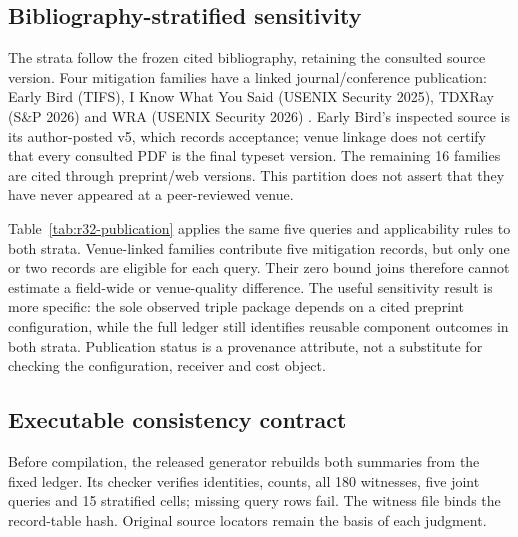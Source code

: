 \subsection{Bibliography-stratified sensitivity}
The strata follow the frozen cited bibliography, retaining the consulted source version. Four mitigation families have a linked journal/conference publication: Early Bird (TIFS), I Know What You Said (USENIX Security 2025), TDXRay (S\&P 2026) and WRA (USENIX Security 2026) \cite{earlybird2025,gao2025iknow,hornetz2026tdxray,jeong2026wra}. Early Bird's inspected source is its author-posted v5, which records acceptance; venue linkage does not certify that every consulted PDF is the final typeset version. The remaining 16 families are cited through preprint/web versions. This partition does not assert that they have never appeared at a peer-reviewed venue.

Table~\ref{tab:r32-publication} applies the same five queries and applicability rules to both strata. Venue-linked families contribute five mitigation records, but only one or two records are eligible for each query. Their zero bound joins therefore cannot estimate a field-wide or venue-quality difference. The useful sensitivity result is more specific: the sole observed triple package depends on a cited preprint configuration, while the full ledger still identifies reusable component outcomes in both strata. Publication status is a provenance attribute, not a substitute for checking the configuration, receiver and cost object.


\subsection{Executable consistency contract}
Before compilation, the released generator rebuilds both summaries from the fixed ledger. Its checker verifies identities, counts, all 180 witnesses, five joint queries and 15 stratified cells; missing query rows fail. The witness file binds the record-table hash. Original source locators remain the basis of each judgment.
